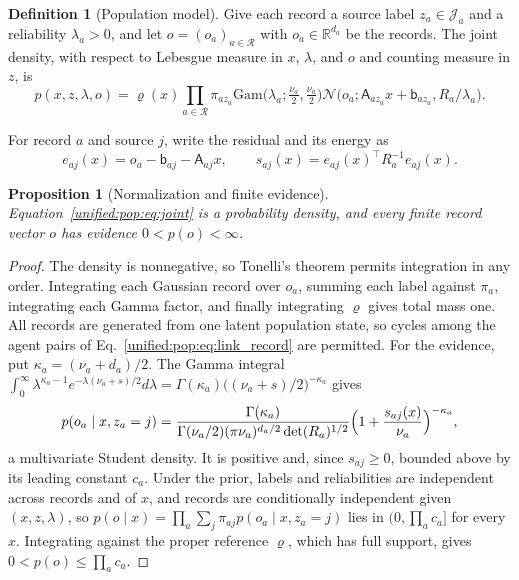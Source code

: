 \documentclass[11pt]{article}
\newtheorem{proposition}[theorem]{Proposition}
\theoremstyle{definition}
\newtheorem{definition}[theorem]{Definition}
\theoremstyle{remark}
\providecommand{\N}{\mathcal{N}}
\providecommand{\R}{\mathbb{R}}
\begin{document}
\begin{definition}[Population model]
\label{unified:pop:def:model}
Give each record a source label $z_a\in\mathcal J_a$ and a reliability $\lambda_a>0$, and let $o=(o_a)_{a\in\mathcal R}$ with $o_a\in\R^{d_a}$ be the records. The joint density, with respect to Lebesgue measure in $x$, $\lambda$, and $o$ and counting measure in $z$, is
\begin{equation}
p(x,z,\lambda,o)=\varrho(x)\prod_{a\in\mathcal R}\pi_{az_a}\mathrm{Gam}\bigl(\lambda_a;\tfrac{\nu_a}{2},\tfrac{\nu_a}{2}\bigr)\N\bigl(o_a;\mathsf A_{az_a}x+\mathsf b_{az_a},R_a/\lambda_a\bigr).
\label{unified:pop:eq:joint}
\end{equation}
\end{definition}

For record $a$ and source $j$, write the residual and its energy as
\begin{equation}
e_{aj}(x)=o_a-\mathsf b_{aj}-\mathsf A_{aj}x,\qquad s_{aj}(x)=e_{aj}(x)^\top R_a^{-1}e_{aj}(x).
\label{unified:pop:eq:energy}
\end{equation}

\begin{proposition}[Normalization and finite evidence]
\label{unified:pop:prop:normalization}
Equation~\eqref{unified:pop:eq:joint} is a probability density, and every finite record vector $o$ has evidence $0<p(o)<\infty$.
\end{proposition}

\begin{proof}
The density is nonnegative, so Tonelli's theorem permits integration in any order. Integrating each Gaussian record over $o_a$, summing each label against $\pi_a$, integrating each Gamma factor, and finally integrating $\varrho$ gives total mass one. All records are generated from one latent population state, so cycles among the agent pairs of Eq.~\eqref{unified:pop:eq:link_record} are permitted. For the evidence, put $\kappa_a=(\nu_a+d_a)/2$. The Gamma integral $\int_0^\infty\lambda^{\kappa_a-1}e^{-\lambda(\nu_a+s)/2}d\lambda=\Gamma(\kappa_a)\bigl((\nu_a+s)/2\bigr)^{-\kappa_a}$ gives
\begin{equation}
p(o_a\mid x,z_a=j)=\frac{\Gamma(\kappa_a)}{\Gamma(\nu_a/2)(\pi\nu_a)^{d_a/2}\det(R_a)^{1/2}}\Bigl(1+\frac{s_{aj}(x)}{\nu_a}\Bigr)^{-\kappa_a},
\label{unified:pop:eq:student}
\end{equation}
a multivariate Student density. It is positive and, since $s_{aj}\ge0$, bounded above by its leading constant $c_a$. Under the prior, labels and reliabilities are independent across records and of $x$, and records are conditionally independent given $(x,z,\lambda)$, so $p(o\mid x)=\prod_a\sum_j\pi_{aj}p(o_a\mid x,z_a=j)$ lies in $(0,\prod_ac_a]$ for every $x$. Integrating against the proper reference $\varrho$, which has full support, gives $0<p(o)\le\prod_ac_a$.
\end{proof}
\end{document}
